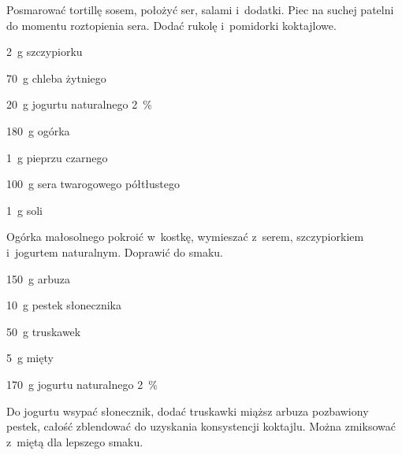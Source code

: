 \documentclass[../kucharek.tex]{subfiles}
\begin{document}
Posmarować tortillę sosem, położyć ser, salami i~dodatki. Piec na suchej
patelni do momentu roztopienia sera. Dodać rukolę i~pomidorki koktajlowe.


\begin{Ingred}
    \item \qty{2}{\gram} szczypiorku
    \item \qty{70}{\gram} chleba żytniego
    \item \qty{20}{\gram} jogurtu naturalnego \qty{2}{\percent}
    \item \qty{180}{\gram} ogórka
    \item \qty{1}{\gram} pieprzu czarnego
    \item \qty{100}{\gram} sera twarogowego półtłustego
    \item \qty{1}{\gram} soli
\end{Ingred}

Ogórka małosolnego pokroić w~kostkę, wymieszać z~serem, szczypiorkiem
i~jogurtem naturalnym. Doprawić do smaku.


\begin{Ingred}
    \item \qty{150}{\gram} arbuza
    \item \qty{10}{\gram} pestek słonecznika
    \item \qty{50}{\gram} truskawek
    \item \qty{5}{\gram} mięty
    \item \qty{170}{\gram} jogurtu naturalnego \qty{2}{\percent}
\end{Ingred}

Do jogurtu wsypać słonecznik, dodać truskawki miąższ arbuza pozbawiony pestek,
całość zblendować do uzyskania konsystencji koktajlu. Można zmiksować z~miętą
dla lepszego smaku.

\end{document}
